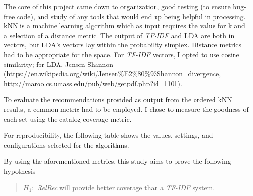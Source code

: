 The core of this project came down to organization, good testing (to ensure bug-free code), and study of any tools that would end up being helpful in processing. kNN is a machine learning algorithm which as input requires the value for k and a selection of a distance metric. The output of \emph{TF-IDF} and LDA are both in vectors, but LDA’s vectors lay within the probability simplex. Distance metrics had to be appropriate for the space. For \emph{TF-IDF} vectors, I opted to use cosine similarity; for LDA, Jensen-Shannon (\url{https://en.wikipedia.org/wiki/Jensen%E2%80%93Shannon_divergence, http://maroo.cs.umass.edu/pub/web/getpdf.php?id=1101}). %

To evaluate the recommendations provided as output from the ordered kNN results, a common metric had to be employed. I chose to measure the goodness of each set using the catalog coverage metric. %

For reproducibility, the following table shows the values, settings, and configurations selected for the algorithms.

By using the aforementioned metrics, this study aims to prove the following hypothesis
	\begin{quote}
		$H_{1}:$ \emph{RelRec} will provide better coverage than a \emph{TF-IDF} system.

	\end{quote}
